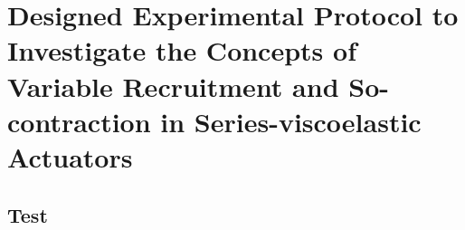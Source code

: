 \chapter{Designed Experimental Protocol to Investigate the Concepts of Variable Recruitment and So-contraction in Series-viscoelastic Actuators} \label{appendixB}

\section{Test}

